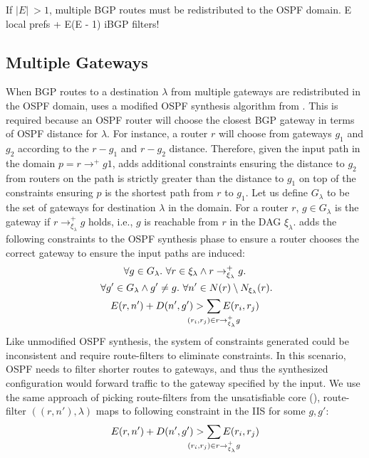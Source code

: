 If $|E| ~> 1$, multiple BGP routes must be redistributed to 
the OSPF domain.
E local prefs + E(E - 1) iBGP filters!

\subsection{Multiple Gateways}
When BGP routes to a destination $\lambda$ 
from multiple gateways are redistributed in
the OSPF domain, \name uses a modified OSPF synthesis
algorithm from . This is 
required because an OSPF router will choose
the closest BGP gateway in terms of OSPF distance 
for $\lambda$. For instance, a router $r$ will choose
from gateways $g_1$ and $g_2$ according to the $r-g_1$
and $r-g_2$ distance. Therefore, given the input path in
the domain $p=r \rightarrow^+ g1$, \name adds additional
constraints ensuring the distance to $g_2$ from routers
on the path is strictly
greater than the distance to $g_1$ 
on top of the constraints ensuring
$p$ is the shortest path from $r$ to $g_1$. 
Let us define $G_\lambda$ to be the set of gateways
for destination $\lambda$ in the domain. For 
a router $r$, $g \in G_\lambda$ is the gateway if
$r \rightarrow^+_{\xi_{\lambda}} g$ holds, i.e., $g$ 
is reachable from $r$ in the DAG $\xi_{\lambda}$.  
\name adds the following constraints to the 
OSPF synthesis phase to ensure a router
chooses the correct gateway to ensure the input 
paths are induced: 
\begin{multline} \label{eq:gateway}
\forall g \in G_{\lambda}.~\forall r \in \xi_\lambda 
\wedge r \rightarrow^+_{\xi_{\lambda}} g. \\
~\forall g' \in G_{\lambda} \wedge g' \not= g. 
~\forall n' \in N(r) \setminus N_{\xi_\lambda}(r). \\
E(r, n') + D(n', g') > \sum_{\mathclap{\substack{(r_i,r_j) \in r \rightarrow^+_{\xi_{\lambda}} g }}} 
E(r_i, r_j) 
\end{multline}
Like unmodified OSPF synthesis, the system of
constraints generated could be inconsistent and require
route-filters to eliminate constraints. In this scenario,
OSPF needs to filter shorter routes to gateways, and
thus the synthesized configuration would forward traffic to
the gateway specified by the input. We use the same 
approach of picking route-filters from the unsatisfiable core
(), route-filter $((r, n'), \lambda)$
maps to following constraint in the IIS for some $g,g'$: 
\begin{equation}
E(r, n') + D(n', g') > \sum_{\mathclap{\substack{(r_i,r_j) \in r \rightarrow^+_{\xi_{\lambda}} g }}} 
E(r_i, r_j) 
\end{equation}
